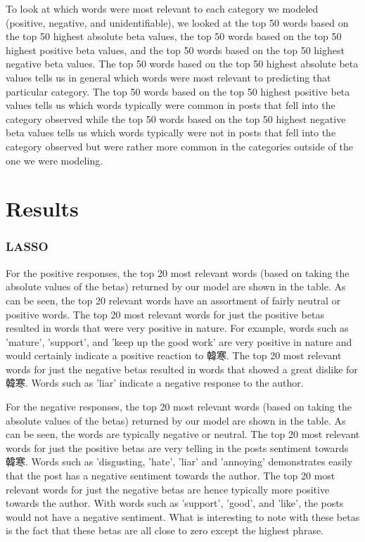 \documentclass[11pt]{article}
\newcommand{\1}[1]{{\mathbf 1}\left\{#1\right\}}        %
\begin{document}
To look at which words were most relevant to each category we modeled (positive, negative, and unidentifiable), we looked at the top 50 words based on the top 50 highest absolute beta values, the top 50 words based on the top 50 highest positive beta values, and the top 50 words based on the top 50 highest negative beta values.  The top 50 words based on the top 50 highest 
absolute beta values tells us in general which words were most relevant to predicting that particular category.  The top 50 words based on the top 50 highest positive beta values tells us which words typically were common in posts that fell into the category observed while the top 50 words based on the top 50 highest negative beta values tells us which words typically 
were not in posts that fell into the category observed but were rather more common in the categories outside of the one we were modeling.


\section{Results}

\subsubsection{LASSO}

For the positive responses, the top 20 most relevant words (based on taking the absolute values of the betas) returned by our model are shown in the table. As can be seen, the top 20 relevant words have an assortment of fairly neutral or positive words. The top 20 most relevant words for just the positive betas resulted in words that were very positive in nature. For example, words such as 'mature', 'support', and 'keep up the good work' are very positive in nature and would certainly indicate a positive reaction to 韓寒. The top 20 most relevant words for just the negative betas resulted in words that showed a great dislike for 韓寒.  Words such as 'liar' indicate a negative response to the author. 

For the negative responses, the top 20 most relevant words (based on taking the absolute values of the betas) returned by our model are shown in the table. As can be seen, the words are typically negative or neutral.  The top 20 most relevant words for just the positive betas are very telling in the posts sentiment towards 韓寒. Words such as 'disgusting, 'hate', 'liar' and 'annoying' demonstrates easily that the post has a negative sentiment towards the author. The top 20 most relevant words for just the negative betas are hence typically more positive towards the author. With words such as 'support', 'good', and 'like', the posts would not have a negative sentiment. What is interesting to note with these betas is the fact that these betas are all close to
zero except the highest phrase. 
\end{document}
